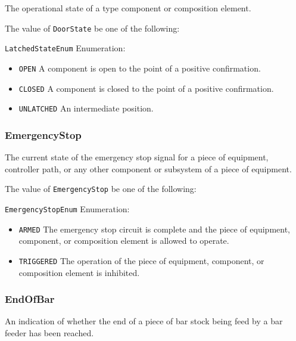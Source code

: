 The operational state of a  type component or composition element.


The value of \texttt{DoorState} \MUST be one of the following: 


\texttt{LatchedStateEnum} Enumeration:

\begin{itemize}
\item \texttt{OPEN} \newline A component is open to the point of a positive confirmation. 
\item \texttt{CLOSED} \newline A component is closed to the point of a positive confirmation. 
\item \texttt{UNLATCHED} \newline An intermediate position. 
\end{itemize}

\FloatBarrier

\subsubsection{EmergencyStop}
\label{sec:EmergencyStop}



The current state of the emergency stop signal for a piece of equipment, controller path, or any other component or subsystem of a piece of equipment.


The value of \texttt{EmergencyStop} \MUST be one of the following: 


\texttt{EmergencyStopEnum} Enumeration:

\begin{itemize}
\item \texttt{ARMED} \newline The emergency stop circuit is complete and the piece of equipment, component, or composition element is allowed to operate.  
\item \texttt{TRIGGERED} \newline The operation of the piece of equipment, component, or composition element is inhibited. 
\end{itemize}

\FloatBarrier

\subsubsection{EndOfBar}




An indication of whether the end of a piece of bar stock being feed by a bar feeder has been reached.


